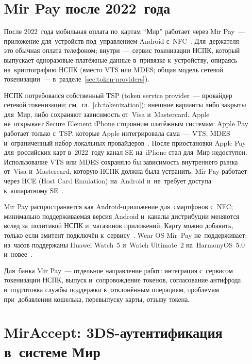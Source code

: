 \section{Mir Pay после 2022~года}\label{sec:mir-pay}

После 2022~года мобильная оплата по~картам \enquote{Мир} работает через Mir
Pay~--- приложение для~устройств под~управлением Android
с~NFC~\cite{mir-pay-help,nspk-tsp}. Для~держателя это обычная оплата телефоном;
внутри~--- сервис токенизации НСПК, который выпускает одноразовые платёжные
данные в~привязке к~устройству, опираясь на~криптографию НСПК (вместо VTS или
  MDES; общая модель сетевой токенизации~---
в~разделе~\ref{sec:token-providers}).

НСПК потребовался собственный TSP (token service provider~--- провайдер сетевой
токенизации; см.~гл.~\ref{ch:tokenization}): внешние варианты либо закрыты
для~Мир, либо сохраняют зависимость от~Visa и~Mastercard. Apple не~открывает Secure Element iPhone сторонним платёжным
системам: Apple Pay работает только с~TSP, которые Apple интегрировала сама~---
VTS, MDES
и~ограниченный набор локальных провайдеров~\cite{apple-pay-security}. После приостановки Apple Pay
для~российских карт в~2022~году канал SE на~iPhone стал для~Мир недоступен.
Использование VTS или MDES сохраняло бы зависимость внутреннего рынка от~Visa
и~Mastercard, которую НСПК должна была устранить. Mir Pay работает через
HCE (Host Card Emulation) на~Android и~не~требует доступа к~аппаратному
SE~\cite{nspk-tsp,mir-pay-help}.

Mir Pay распространяется как Android-приложение для~смартфонов с~NFC;
минимально поддерживаемая версия Android и~каналы дистрибуции меняются вслед
за~политикой НСПК и~магазинов приложений. Карту можно добавить, только если
эмитент подключён к~сервису~\cite{mir-pay-help}. Wear OS Mir~Pay
не~поддерживает; из~часов поддержаны Huawei Watch~5 и~Watch Ultimate~2
на~HarmonyOS~5.0 и~новее~\cite{mir-pay-help}.

Для~банка Mir Pay~--- отдельное направление работ: интеграция
с~сервисом токенизации НСПК, выпуск и~сопровождение токенов, согласование
антифрода и~подготовка службы поддержки к~отклонённым операциям, проблемам
при~добавлении кошелька, перевыпуску карты, отзыву токена.

\section{MirAccept: 3DS-аутентификация в~системе Мир}\label{sec:mir-accept}

